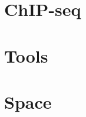 \documentclass[PhD]{ucdavisthesis}
\begin{document}




\part{ChIP-seq}




\part{Tools}




\part{Space}



\end{document}
